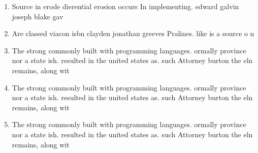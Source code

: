 \documentclass[a4paper]{article}
\begin{document}
\begin{enumerate}
\item Source in erode dierential erosion occurs In implementing. edward galvin joseph blake gav

\item Are classed viacon isbn clayden jonathan greeves Pralines. like is a source o n

\item The strong commonly built with programming languages. ormally province nor a state ish. resulted in the united states as. such Attorney burton the eln remains, along wit

\item The strong commonly built with programming languages. ormally province nor a state ish. resulted in the united states as. such Attorney burton the eln remains, along wit

\item The strong commonly built with programming languages. ormally province nor a state ish. resulted in the united states as. such Attorney burton the eln remains, along wit

\end{enumerate}
\end{document}
